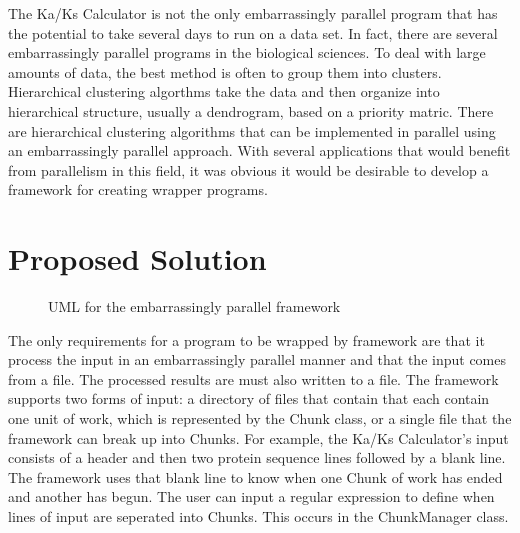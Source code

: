 \documentclass[12pt]{article}
\begin{document}
The Ka/Ks Calculator is not the only embarrassingly parallel program that has the
potential to take several days to run on a data set. In fact, there are several
embarrassingly parallel programs in the biological sciences. To deal with large
amounts of data, the best method is often to group them into clusters. 
Hierarchical clustering algorthms take the data and then organize into
hierarchical structure, usually a dendrogram, based on a priority matric. There 
are hierarchical clustering algorithms that can be implemented in parallel using
an embarrassingly parallel approach.  With several applications that would 
benefit from parallelism in this field, it was obvious it would be desirable to 
develop a framework for creating wrapper programs. \cite{cluster}


\section{Proposed Solution}
\begin{figure}
{}
\caption{UML for the embarrassingly parallel framework}
\label{fig:uml}
\end{figure}
The only requirements for a program to be wrapped by framework are that it 
process the input in an embarrassingly parallel manner and that the input comes 
from a file. The processed results are must also written to a file. The 
framework supports two forms of input: a directory of files that contain that 
each contain one unit of work, which is represented by the Chunk class, or a 
single file that the framework can break up into Chunks. For example, the Ka/Ks 
Calculator's input consists of a header and then two protein sequence lines 
followed by a blank line. The framework uses that blank line to know when one 
Chunk of work has ended and another has begun. The user can input a regular 
expression to define when lines of input are seperated into Chunks. This occurs 
in the ChunkManager class. 
\end{document}
